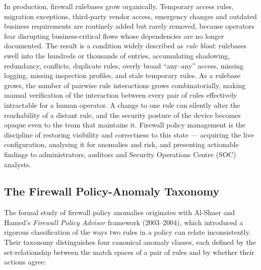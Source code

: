 In production, firewall rulebases grow organically. Temporary access rules, migration exceptions, third-party vendor access, emergency changes and outdated business requirements are routinely added but rarely removed, because operators fear disrupting business-critical flows whose dependencies are no longer documented. The result is a condition widely described as \emph{rule bloat}: rulebases swell into the hundreds or thousands of entries, accumulating shadowing, redundancy, conflicts, duplicate rules, overly broad ``any--any'' access, missing logging, missing inspection profiles, and stale temporary rules. As a rulebase grows, the number of pairwise rule interactions grows combinatorially, making manual verification of the interaction between every pair of rules effectively intractable for a human operator. A change to one rule can silently alter the reachability of a distant rule, and the security posture of the device becomes opaque even to the team that maintains it. Firewall policy management is the discipline of restoring visibility and correctness to this state --- acquiring the live configuration, analysing it for anomalies and risk, and presenting actionable findings to administrators, auditors and Security Operations Centre (SOC) analysts.

\subsection{The Firewall Policy-Anomaly Taxonomy}
\label{sec:ch2-taxonomy}
The formal study of firewall policy anomalies originates with Al-Shaer and Hamed's \emph{Firewall Policy Advisor} framework (2003--2004), which introduced a rigorous classification of the ways two rules in a policy can relate inconsistently. Their taxonomy distinguishes four canonical anomaly classes, each defined by the set-relationship between the match spaces of a pair of rules and by whether their actions agree:

